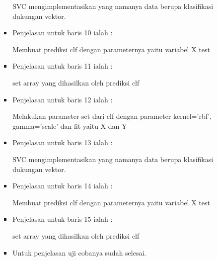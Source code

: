 \begin{itemize}
\begin{itemize}
\begin{itemize}
\begin{itemize}
\par SVC mengimplementasikan yang namanya data berupa klasifikasi dukungan vektor.
\par
\item Penjelasan untuk baris 10 ialah :
\par Membuat prediksi clf dengan parameternya yaitu variabel X test
\par
\item Penjelasan untuk baris 11 ialah :
\par set array yang dihasilkan oleh prediksi clf
\par
\item Penjelasan untuk baris 12 ialah :
\par Melakukan parameter set dari clf dengan parameter kernel='rbf', gamma='scale' dan fit yaitu X dan Y
\par
\item Penjelasan untuk baris 13 ialah :
\par  SVC mengimplementasikan yang namanya data berupa klasifikasi dukungan vektor.
\par
\item Penjelasan untuk baris 14 ialah :
\par Membuat prediksi clf dengan parameternya yaitu variabel X test
\par
\item Penjelasan untuk baris 15 ialah :
\par set array yang dihasilkan oleh prediksi clf
\par
\item Untuk penjelasan uji cobanya sudah selesai.
\par

\end{itemize}
\end{itemize}




\end{itemize}
\end{itemize}
